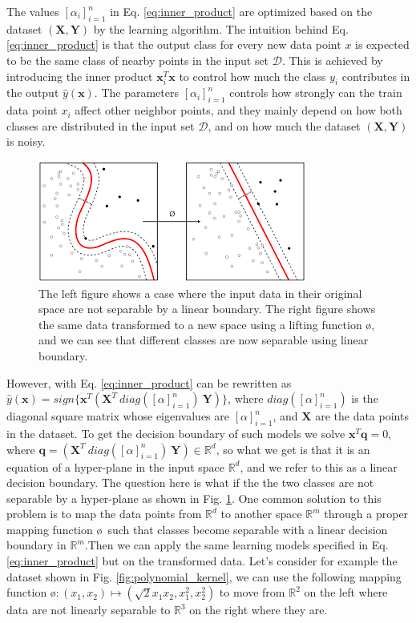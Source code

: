 The values $[\alpha_i]_{i=1}^n$ in Eq. \ref{eq:inner_product} are optimized based on the dataset $(\mathbf{X,Y})$ by the learning algorithm. The intuition behind Eq. \ref{eq:inner_product} is that the output class for every new data point $x$ is expected to be the same class of nearby points in the input set $\mathcal{D}$. This is achieved by introducing the inner product $\mathbf{x}_i^T\mathbf{x}$ to control how much the class $y_i$ contributes in the output $\hat{y}(\mathbf{x})$. The parameters $[\alpha_i]_{i=1}^n$ controls how strongly can the train data point $x_i$ affect other neighbor points, and they mainly depend on how both classes are distributed in the input set $\mathcal{D}$, and on how much the dataset $(\mathbf{X,Y})$ is noisy. 
\begin{figure}[H]
\centering
\includegraphics[scale=0.5]{figs/svm.png}
\caption[The case where classes aren't separable using linear boundary]{The left figure shows a case where the input data in their original space are not separable by a linear boundary. The right figure shows the same data transformed to a new space using a lifting function \o, and we can see that different classes are now separable  using linear boundary.}
\label{fig:SVM_boundaries}
\end{figure}
However, with Eq. \ref{eq:inner_product} can be rewritten as $\hat{y}(\mathbf{x})=sign\{\textbf{x}^T(\mathbf{X}^T~diag([\alpha]_{i=1}^n)~\mathbf{Y})\}$, where $diag([\alpha]_{i=1}^n)$ is the diagonal square matrix whose eigenvalues are $[\alpha]_{i=1}^n$, and $\mathbf{X}$ are the data points in the dataset. To get the decision boundary of such models we solve $\textbf{x}^T\textbf{q}=0$, where $\textbf{q}=(\mathbf{X}^T~diag([\alpha]_{i=1}^n)~\mathbf{Y})\in\mathbb{R}^d$, so what we get is that it is an equation of a hyper-plane in the input space $\mathbb{R}^d$, and we refer to this as a linear decision boundary. The question here is what if the the two classes are not separable by a hyper-plane as shown in Fig. \ref{fig:SVM_boundaries}. One common solution to this problem is to map the data points from $\mathbb{R}^d$ to another space $\mathbb{R}^m$  through a proper mapping function \o~such that classes become separable with a linear decision boundary in $\mathbb{R}^m$.Then we can apply the same learning models specified in Eq. \ref{eq:inner_product} but on the transformed data. Let's consider for example the dataset shown in Fig. \ref{fig:polynomial_kernel},  we can use the following mapping function \o$:(x_1,x_2)\mapsto (\sqrt{2}x_1x_2,x_1^2,x_2^2)$ to move from $\mathbb{R}^2$ on the left where data are not linearly separable to $\mathbb{R}^3$ on the right where they are.
